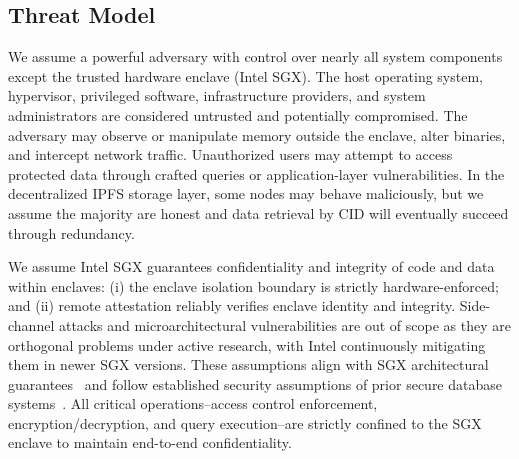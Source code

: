 \documentclass[conference]{IEEEtran}
\begin{document}
\subsection{Threat Model} \label{subsec:threat model}
We assume a powerful adversary with control over nearly all system components except the trusted hardware enclave (Intel SGX). The host operating system, hypervisor, privileged software, infrastructure providers, and system administrators are considered untrusted and potentially compromised. The adversary may observe or manipulate memory outside the enclave, alter binaries, and intercept network traffic. Unauthorized users may attempt to access protected data through crafted queries or application-layer vulnerabilities. In the decentralized IPFS storage layer, some nodes may behave maliciously, but we assume the majority are honest and data retrieval by CID will eventually succeed through redundancy.

We assume Intel SGX guarantees confidentiality and integrity of code and data within enclaves: (i) the enclave isolation boundary is strictly hardware-enforced; and (ii) remote attestation reliably verifies enclave identity and integrity. Side-channel attacks and microarchitectural vulnerabilities are out of scope as they are orthogonal problems under active research, with Intel continuously mitigating them in newer SGX versions. These assumptions align with SGX architectural guarantees~\cite{costan2016intel, el2022benchmarking} and follow established security assumptions of prior secure database systems~\cite{priebe2018enclavedb, yang2024secudb, vinayagamurthy2019stealthdb}. All critical operations--access control enforcement, encryption/decryption, and query execution--are strictly confined to the SGX enclave to maintain end-to-end confidentiality.


%
%
\end{document}
